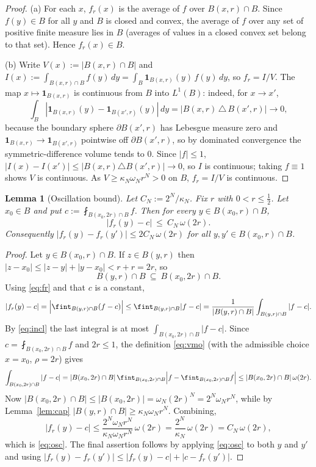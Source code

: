\documentclass{amsart}
\newtheorem{lemma}{Lemma}
\theoremstyle{definition}
\begin{document}
\begin{proof}
(a) For each $x$, $f_r(x)$ is the average of $f$ over $B(x,r)\cap B$. Since
$f(y)\in B$ for all $y$ and $B$ is closed and convex, the average of $f$ over any
set of positive finite measure lies in $B$ (averages of values in a closed convex
set belong to that set). Hence $f_r(x)\in B$.

(b) Write $V(x):=|B(x,r)\cap B|$ and $I(x):=\int_{B(x,r)\cap B}f(y)\,dy
=\int_B \mathbf 1_{B(x,r)}(y)\,f(y)\,dy$, so $f_r=I/V$. The map
$x\mapsto \mathbf 1_{B(x,r)}$ is continuous from $B$ into $L^1(B)$: indeed, for
$x\to x'$,
\[
\int_B|\mathbf 1_{B(x,r)}(y)-\mathbf 1_{B(x',r)}(y)|\,dy
=|B(x,r)\,\triangle\,B(x',r)|\to0,
\]
because the boundary sphere $\partial B(x',r)$ has Lebesgue measure zero and
$\mathbf 1_{B(x,r)}\to\mathbf 1_{B(x',r)}$ pointwise off $\partial B(x',r)$, so by
dominated convergence the symmetric-difference volume tends to $0$. Since
$|f|\le1$, $|I(x)-I(x')|\le |B(x,r)\triangle B(x',r)|\to0$, so $I$ is continuous;
taking $f\equiv1$ shows $V$ is continuous. As $V\ge\kappa_N\omega_N r^N>0$ on $B$,
$f_r=I/V$ is continuous.
\end{proof}

\begin{lemma}[Oscillation bound]\label{lem:osc}
Let $C_N:=2^{N}/\kappa_N$. Fix $r$ with $0<r\le\tfrac12$. Let $x_0\in B$ and put
$c:=\fint_{B(x_0,2r)\cap B}f$. Then for every $y\in B(x_0,r)\cap B$,
\begin{equation}\label{eq:osc}
|f_r(y)-c|\ \le\ C_N\,\omega(2r).
\end{equation}
Consequently $|f_r(y)-f_r(y')|\le 2C_N\,\omega(2r)$ for all $y,y'\in
B(x_0,r)\cap B$.
\end{lemma}

\begin{proof}
Let $y\in B(x_0,r)\cap B$. If $z\in B(y,r)$ then
$|z-x_0|\le|z-y|+|y-x_0|<r+r=2r$, so
\begin{equation}\label{eq:incl}
B(y,r)\cap B\ \subseteq\ B(x_0,2r)\cap B.
\end{equation}
Using \eqref{eq:fr} and that $c$ is a constant,
\[
|f_r(y)-c|=\Bigl|\fint_{B(y,r)\cap B}(f-c)\Bigr|
\le\fint_{B(y,r)\cap B}|f-c|
=\frac{1}{|B(y,r)\cap B|}\int_{B(y,r)\cap B}|f-c|.
\]
By \eqref{eq:incl} the last integral is at most
$\int_{B(x_0,2r)\cap B}|f-c|$. Since $c=\fint_{B(x_0,2r)\cap B}f$ and $2r\le1$,
the definition \eqref{eq:vmo} (with the admissible choice $x=x_0$, $\rho=2r$)
gives
\[
\int_{B(x_0,2r)\cap B}|f-c|
=|B(x_0,2r)\cap B|\,\fint_{B(x_0,2r)\cap B}\Bigl|f-\fint_{B(x_0,2r)\cap B}f\Bigr|
\le |B(x_0,2r)\cap B|\,\omega(2r).
\]
Now $|B(x_0,2r)\cap B|\le|B(x_0,2r)|=\omega_N(2r)^N=2^N\omega_N r^N$, while by
Lemma~\ref{lem:cap} $|B(y,r)\cap B|\ge\kappa_N\omega_N r^N$. Combining,
\[
|f_r(y)-c|\le\frac{2^N\omega_N r^N}{\kappa_N\omega_N r^N}\,\omega(2r)
=\frac{2^N}{\kappa_N}\,\omega(2r)=C_N\,\omega(2r),
\]
which is \eqref{eq:osc}. The final assertion follows by applying \eqref{eq:osc} to
both $y$ and $y'$ and using $|f_r(y)-f_r(y')|\le|f_r(y)-c|+|c-f_r(y')|$.
\end{proof}
\end{document}
